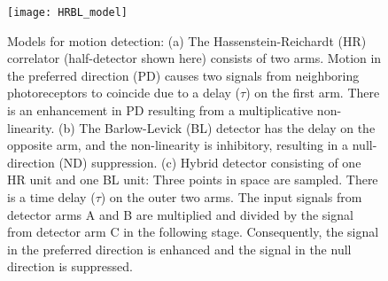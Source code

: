 \begin{figure}
\centering
\hspace*{-1cm} 
\texttt{[image: HRBL\_model]}
\caption[Models for motion detection] {Models for motion detection: (a) The Hassenstein-Reichardt (HR) correlator (half-detector shown here) consists of two arms. Motion in the preferred direction (PD) causes two signals from neighboring photoreceptors to coincide due to a delay ($\tau$) on the first arm. There is an enhancement in PD resulting from a multiplicative non-linearity. (b) The Barlow-Levick (BL) detector has the delay on the opposite arm, and the non-linearity is inhibitory, resulting in a null-direction (ND) suppression. (c) Hybrid detector consisting of one HR unit and one BL unit: Three points in space are sampled. There is a time delay ($\tau$) on the outer two arms. The input signals from detector arms A and B are multiplied and divided by the signal from detector arm C in the following stage. Consequently, the signal in the preferred direction is enhanced and the signal in the null direction is suppressed.}
\label{fig:hrblmodel}
\end{figure}







